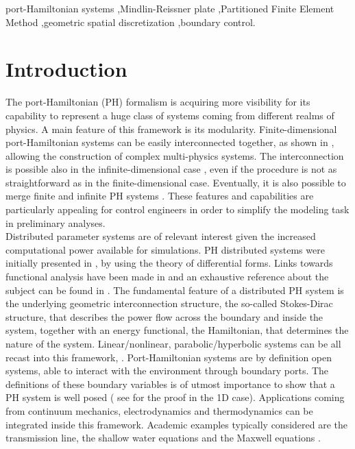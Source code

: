 \documentclass[preprint,12pt]{elsarticle}
\begin{document}
\begin{frontmatter}
		\begin{keyword}
			port-Hamiltonian systems \sep Mindlin-Reissner plate \sep Partitioned Finite Element Method \sep geometric spatial discretization \sep boundary control.		
		\end{keyword}
		
	\end{frontmatter}

	
	\section*{Introduction}
	The port-Hamiltonian (PH) formalism is acquiring more visibility for its capability to represent a huge class of systems coming from different realms of physics. A main feature of this framework is its modularity. Finite-dimensional port-Hamiltonian systems can be easily interconnected together, as shown in \cite{Cervera2007}, allowing the construction of complex multi-physics systems. The interconnection is possible also in the infinite-dimensional case \cite{ShaftIntInfinite}, even if the procedure is not as straightforward as in the finite-dimensional case. Eventually, it is also possible to merge finite and infinite PH systems \cite{vanderShaftintFinInf}. These features and capabilities are particularly appealing for control engineers in order to simplify the modeling task in preliminary analyses. \\
	
	
	Distributed parameter systems are of relevant interest given the increased computational power available for simulations. PH distributed systems were initially presented in \cite{VANDERSCHAFT2002166}, by using the theory of differential forms. Links towards functional analysis have been made in \cite{Villegas} and an exhaustive reference about the subject can be found in \cite{BookZwart}. The fundamental feature of a distributed PH system is the underlying geometric interconnection structure, the so-called Stokes-Dirac structure, that describes the power flow across the boundary and inside the system, together with an energy functional, the Hamiltonian, that determines the nature of the system. Linear/nonlinear, parabolic/hyperbolic systems can be all recast into this framework, \cite{bookPHs}. Port-Hamiltonian systems are by definition open systems, able to interact with the environment through boundary ports. The definitions of these boundary variables is of utmost importance to show that a PH system is well posed ( see \cite{LeGorrec2005} for the proof in the 1D case). Applications coming from continuum mechanics, electrodynamics and thermodynamics can be integrated inside this framework. Academic examples typically considered are the transmission line, the shallow water equations and the Maxwell equations \cite{PHbookShaft}. \\
	
\end{document}

